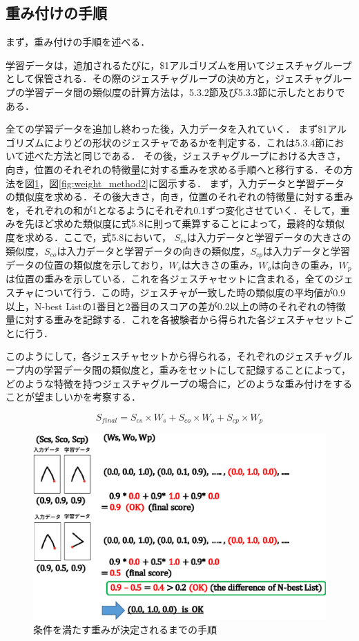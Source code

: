 \subsection{重み付けの手順}
まず，重み付けの手順を述べる．

学習データは，追加されるたびに，\$1アルゴリズムを用いてジェスチャグループとして保管される．その際のジェスチャグループの決め方と，ジェスチャグループの学習データ間の類似度の計算方法は，5.3.2節及び5.3.3節に示したとおりである．

全ての学習データを追加し終わった後，入力データを入れていく．
まず\$1アルゴリズムによりどの形状のジェスチャであるかを判定する．これは5.3.4節において述べた方法と同じである．
その後，ジェスチャグループにおける大きさ，向き，位置のそれぞれの特徴量に対する重みを求める手順へと移行する．その方法を図\ref{fig:weight_method1}，図\ref{fig:weight_method2}に図示する．
まず，入力データと学習データの類似度を求める．その後大きさ，向き，位置のそれぞれの特徴量に対する重みを，それぞれの和が1となるようにそれぞれ0.1ずつ変化させていく．そして，重みを先ほど求めた類似度に式5.8に則って乗算することによって，最終的な類似度を求める．ここで，式5.8において， $S_\textit{cs}$は入力データと学習データの大きさの類似度，$S_\textit{co}$は入力データと学習データの向きの類似度，$S_\textit{cp}$は入力データと学習データの位置の類似度を示しており，$W_\textit{s}$は大きさの重み，$W_\textit{o}$は向きの重み，$W_\textit{p}$は位置の重みを示している．これを各ジェスチャセットに含まれる，全てのジェスチャについて行う．この時，ジェスチャが一致した時の類似度の平均値が0.9以上，N-best Listの1番目と2番目のスコアの差が0.2以上の時のそれぞれの特徴量に対する重みを記録する．これを各被験者から得られた各ジェスチャセットごとに行う．

このようにして，各ジェスチャセットから得られる，それぞれのジェスチャグループ内の学習データ間の類似度と，重みをセットにして記録することによって，どのような特徴を持つジェスチャグループの場合に，どのような重み付けをすることが望ましいかを考察する．

\begin{equation}
S_\textit{final} = S_\textit{cs} \times W_\textit{s} + S_\textit{co} \times W_\textit{o} + S_\textit{cp} \times W_\textit{p}
\end{equation}

\begin{figure} [h!]
	\begin{center}
		\includegraphics [width=0.8\hsize ]{img/weight_method2.eps}
	\end{center}
	\caption{条件を満たす重みが決定されるまでの手順}
	\label{fig:weight_method1}
\end{figure}

